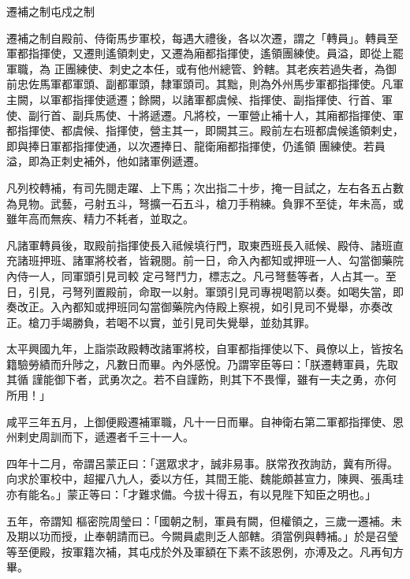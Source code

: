 
\begin{pinyinscope}

 遷補之制屯戍之制



 遷補之制自殿前、侍衛馬步軍校，每遇大禮後，各以次遷，謂之「轉員」。轉員至軍都指揮使，又遷則遙領刺史，又遷為廂都指揮使，遙領團練使。員溢，即從上罷軍職，為
 正團練使、刺史之本任，或有他州總管、鈐轄。其老疾若過失者，為御前忠佐馬軍都軍頭、副都軍頭，隸軍頭司。其黜，則為外州馬步軍都指揮使。凡軍主闕，以軍都指揮使遞遷；餘闕，以諸軍都虞候、指揮使、副指揮使、行首、軍使、副行首、副兵馬使、十將遞遷。凡將校，一軍營止補十人，其廂都指揮使、軍都指揮使、都虞候、指揮使，營主其一，即闕其三。殿前左右班都虞候遙領剌史，即與捧日軍都指揮使通，以次遷捧日、龍衛廂都指揮使，仍遙領
 團練使。若員溢，即為正刺史補外，他如諸軍例遞遷。



 凡列校轉補，有司先閱走躍、上下馬；次出指二十步，掩一目試之，左右各五占數為見物。武藝，弓射五斗，弩擴一石五斗，槍刀手稍練。負罪不至徒，年未高，或雖年高而無疾、精力不耗者，並取之。



 凡諸軍轉員後，取殿前指揮使長入祗候填行門，取東西班長入祗候、殿侍、諸班直充諸班押班、諸軍將校者，皆親閱。前一日，命入內都知或押班一人、勾當御藥院內侍一人，同軍頭引見司較
 定弓弩鬥力，標志之。凡弓弩藝等者，人占其一。至日，引見，弓弩列置殿前，命取一以射。軍頭引見司專視喝箭以奏。如喝失當，即奏改正。入內都知或押班同勾當御藥院內侍殿上察視，如引見司不覺舉，亦奏改正。槍刀手竭勝負，若喝不以實，並引見司失覺舉，並劾其罪。



 太平興國九年，上詣崇政殿轉改諸軍將校，自軍都指揮使以下、員僚以上，皆按名籍驗勞績而升陟之，凡數日而畢。內外感悅。乃謂宰臣等曰：「朕遷轉軍員，先取其循
 謹能御下者，武勇次之。若不自謹飭，則其下不畏憚，雖有一夫之勇，亦何所用！」



 咸平三年五月，上御便殿遷補軍職，凡十一日而畢。自神衛右第二軍都指揮使、恩州剌史周訓而下，遞遷者千三十一人。



 四年十二月，帝謂呂蒙正曰：「選眾求才，誠非易事。朕常孜孜詢訪，冀有所得。向求於軍校中，超擢八九人，委以方任，其間王能、魏能頗甚宣力，陳興、張禹珪亦有能名。」蒙正等曰：「才難求備。今拔十得五，有以見陛下知臣之明也。」



 五年，帝謂知
 樞密院周瑩曰：「國朝之制，軍員有闕，但權領之，三歲一遷補。未及期以功而授，止奉朝請而已。今闕員處則乏人部轄。須當例與轉補。」於是召瑩等至便殿，按軍籍次補，其屯戍於外及軍額在下素不該恩例，亦溥及之。凡再旬方畢。




\end{pinyinscope}
